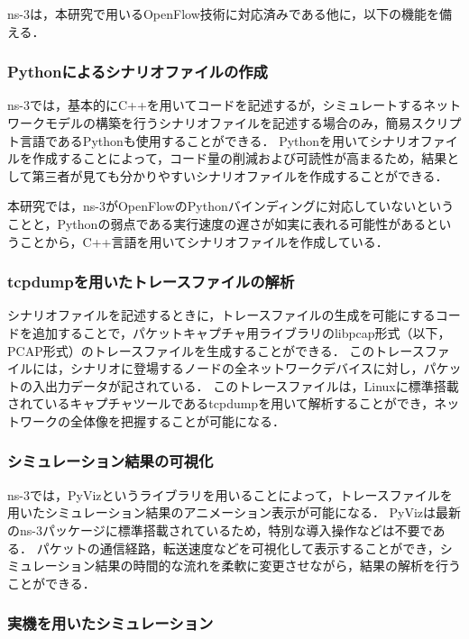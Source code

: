 ns-3は，本研究で用いるOpenFlow技術に対応済みである他に，以下の機能を備える．

\subsubsection{Pythonによるシナリオファイルの作成}

ns-3では，基本的にC++を用いてコードを記述するが，シミュレートするネットワークモデルの構築を行うシナリオファイルを記述する場合のみ，簡易スクリプト言語であるPythonも使用することができる．
Pythonを用いてシナリオファイルを作成することによって，コード量の削減および可読性が高まるため，結果として第三者が見ても分かりやすいシナリオファイルを作成することができる．

本研究では，ns-3がOpenFlowのPythonバインディングに対応していないということと，Pythonの弱点である実行速度の遅さが如実に表れる可能性があるということから，C++言語を用いてシナリオファイルを作成している．

\subsubsection{tcpdumpを用いたトレースファイルの解析}

シナリオファイルを記述するときに，トレースファイルの生成を可能にするコードを追加することで，パケットキャプチャ用ライブラリのlibpcap形式（以下，PCAP形式）のトレースファイルを生成することができる．
このトレースファイルには，シナリオに登場するノードの全ネットワークデバイスに対し，パケットの入出力データが記されている．
このトレースファイルは，Linuxに標準搭載されているキャプチャツールであるtcpdumpを用いて解析することができ，ネットワークの全体像を把握することが可能になる．

\subsubsection{シミュレーション結果の可視化}

ns-3では，PyVizというライブラリを用いることによって，トレースファイルを用いたシミュレーション結果のアニメーション表示が可能になる．
PyVizは最新のns-3パッケージに標準搭載されているため，特別な導入操作などは不要である．
パケットの通信経路，転送速度などを可視化して表示することができ，シミュレーション結果の時間的な流れを柔軟に変更させながら，結果の解析を行うことができる．

\subsubsection{実機を用いたシミュレーション}

